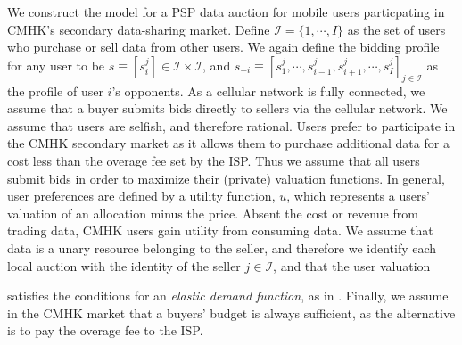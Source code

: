 \documentclass[12pt]{article}
\theoremstyle{definition}
\newcommand{\mcI}{\mathcal{I}}
\begin{document}
\begin{multicols}{2}
We construct the model for a PSP data auction for mobile users
particpating in CMHK's secondary data-sharing market.
Define $\mcI = \lbrace 1, \cdots, I\rbrace$ as the set of users who purchase or sell
data from other users. We again define the bidding profile for any user to be 
$s \equiv
[s_i^j] \in \mcI \times \mcI$, and $s_{-i} \equiv [s_1^j , \cdots , s_{i-1}^j , s_{i+1}^j , \cdots
, s_I^j]_{j\in\mcI}$ as the profile of user $i$'s opponents. 
As a cellular network is fully connected, we assume that a buyer submits bids directly to sellers via the
cellular network. We assume that users are selfish, and therefore
rational. 
Users prefer to participate in the CMHK secondary market as it allows them to purchase
additional data for a cost less than the overage fee set by the ISP. 
Thus we assume that all users submit bids in order to maximize their
(private) valuation functions. 
In general, user preferences are defined by a utility function, $u$, which 
represents a users' valuation of an allocation minus the price.
Absent the cost or revenue from trading data, CMHK users gain utility from consuming
data. 
We assume that data is a unary resource belonging to the seller, and
therefore we identify each local auction with the identity of the seller
$j\in\mcI$, and that the user valuation
\iffalse
is independently and identically
distributed (i.i.d.) and
\fi
satisfies the conditions for an
\emph{elastic demand function}, as in \cite{lazar}.
Finally, we assume in the CMHK market that a buyers' budget is always
sufficient, as the alternative is to pay the overage fee to the ISP.


\end{multicols}
\end{document}
